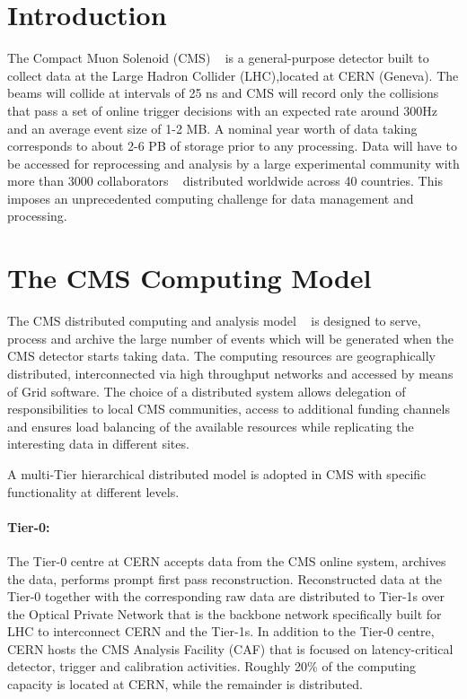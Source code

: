 \section{Introduction}
\label{intro}
The Compact Muon Solenoid (CMS) ~\cite{RefCMS} is a general-purpose detector
built to collect data at the Large Hadron Collider (LHC),located at CERN
(Geneva).
The beams will collide at intervals of 25 ns and CMS will record only the collisions
that pass a set of %
online trigger decisions with an expected rate around 300Hz and an
average event size of 1-2 MB. A nominal year worth of data taking 
corresponds to about 2-6 PB of storage prior to any processing.
Data will have to be accessed for reprocessing and analysis by a
large experimental community with more than 3000 collaborators ~\cite{RefCMSCollaboration} distributed
worldwide across 40 countries. This imposes an unprecedented computing
challenge for data management and processing.

\section{The CMS Computing Model}
\label{sec:2}
The CMS distributed computing and analysis model ~\cite{RefCM} is designed to serve, process and archive the %
large number of events which will be generated when the CMS detector starts taking data. The computing resources are geographically distributed, interconnected via high throughput networks and accessed by means of Grid software. 
The choice of a distributed system allows delegation of responsibilities to local CMS communities, access to additional funding channels and ensures load balancing of the available resources while replicating the interesting data in different sites.


A multi-Tier hierarchical distributed model is adopted in CMS with specific functionality at different levels.
\paragraph{Tier-0:}
The Tier-0 centre at CERN accepts data from the CMS online system, archives the data, performs prompt first pass reconstruction. Reconstructed data at the Tier-0 together with the corresponding raw data are distributed to Tier-1s over the Optical Private Network that is the backbone network specifically built for LHC to interconnect CERN and the Tier-1s.
In addition to the Tier-0 centre, CERN hosts the CMS Analysis Facility (CAF) that is focused on latency-critical detector, trigger and calibration activities.
Roughly 20\% of the computing capacity is located at CERN, while the remainder is distributed.

